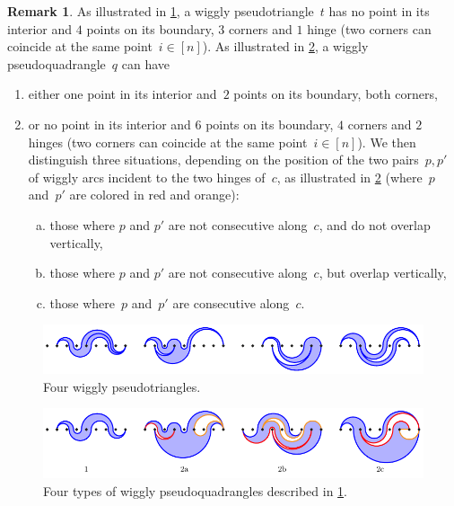 \documentclass{amsart}
\theoremstyle{definition}
\newtheorem{remark}[theorem]{Remark}
\newcommand{\darkblue}{\color{darkblue}} %
\newcommand{\defn}[1]{\textsl{\darkblue #1}} %
\begin{document}
\begin{remark}
\label{rem:descriptionPseudotrianglesPseudoquadrangles}
As illustrated in \cref{fig:pseudotriangles}, a wiggly pseudotriangle~$t$ has no point in its interior and $4$ points on its boundary, $3$ corners and $1$ hinge (two corners can coincide at the same point~$i \in [n]$).
As illustrated in \cref{fig:pseudoquadrangles}, a wiggly pseudoquadrangle~$q$ can have
\begin{enumerate}
\item either one point in its interior and~$2$ points on its boundary, both corners,
\item or no point in its interior and $6$ points on its boundary, $4$ corners and $2$ hinges (two corners can coincide at the same point~$i \in [n]$). We then distinguish three situations, depending on the position of the two pairs~$p, p'$ of wiggly arcs incident to the two hinges of~$c$, as illustrated in \cref{fig:pseudoquadrangles} (where~$p$ and~$p'$ are colored in red and orange):
\begin{enumerate}[(a)]
\item those where $p$ and $p'$ are not consecutive along~$c$, and do not overlap vertically,
\item those where $p$ and $p'$ are not consecutive along~$c$, but overlap vertically,
\item those where~$p$ and~$p'$ are consecutive along~$c$.
\end{enumerate}
\end{enumerate}
%
\begin{figure}
\centerline{\includegraphics[scale=1.3]{pseudotriangles}}
\caption{Four wiggly pseudotriangles.}
\label{fig:pseudotriangles}
\end{figure}
%
\begin{figure}
\centerline{\includegraphics[scale=1.3]{pseudoquadrangles}}
\vspace{-.3cm}
\caption{Four types of wiggly pseudoquadrangles described in \cref{rem:descriptionPseudotrianglesPseudoquadrangles}.}
\label{fig:pseudoquadrangles}
\end{figure}
\end{remark}
\end{document}
